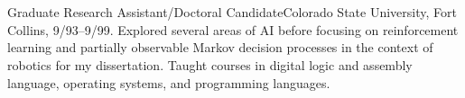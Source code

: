 \documentclass[11pt]{resume}
\begin{document}
\section{}
{Graduate Research Assistant/Doctoral Candidate}{Colorado State University,
  Fort Collins, 9/93--9/99. Explored several areas of AI before focusing on
  reinforcement learning and partially observable Markov decision processes
  in the context of robotics for my dissertation. Taught courses in digital
  logic and assembly language, operating systems, and programming
  languages.}
\end{document}
